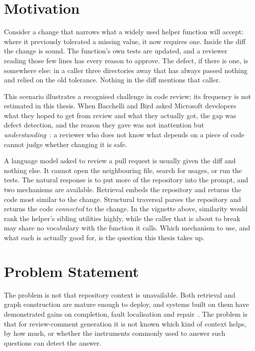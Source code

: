 \section{Motivation}
\label{sec:intro-motivation}

Consider a change that narrows what a widely used helper function will accept:
where it previously tolerated a missing value, it now requires one. Inside the
diff the change is sound. The function's own tests are updated, and a reviewer
reading those few lines has every reason to approve. The defect, if there is
one, is somewhere else: in a caller three directories away that has always
passed nothing and relied on the old tolerance. Nothing in the diff mentions
that caller.

This scenario illustrates a recognised challenge in code review; its frequency
is not estimated in this thesis. When Bacchelli and Bird asked Microsoft
developers what they hoped to get from review and what they actually got, the
gap was defect detection, and the
reason they gave was not inattention but
\emph{understanding}~\cite{bacchelli2013}: a reviewer who does not know what
depends on a piece of code cannot judge whether changing it is safe.

A language model asked to review a pull request is usually given the diff and
nothing else. It cannot open the neighbouring file, search for usages, or run
the tests. The natural response is to put more of the repository into the
prompt, and two mechanisms are available. Retrieval embeds the repository and
returns the code most similar to the change. Structural traversal parses the
repository and returns the code \emph{connected} to the change. In the
vignette above, similarity would rank the helper's sibling utilities highly,
while the caller that is about to break may share no vocabulary with the
function it calls. Which mechanism to use, and what each is actually good for,
is the question this thesis takes up.

\section{Problem Statement}
\label{sec:intro-problem}

The problem is not that repository context is unavailable. Both retrieval and
graph construction are mature enough to deploy, and systems built on them have
demonstrated gains on completion, fault localisation and
repair~\cite{zhang2023repocoder,liu2024graphcoder,yang2025kgcompass}. The
problem is that for review-comment generation it is not known which kind of
context helps, by how much, or whether the instruments commonly used to answer
such questions can detect the answer.

